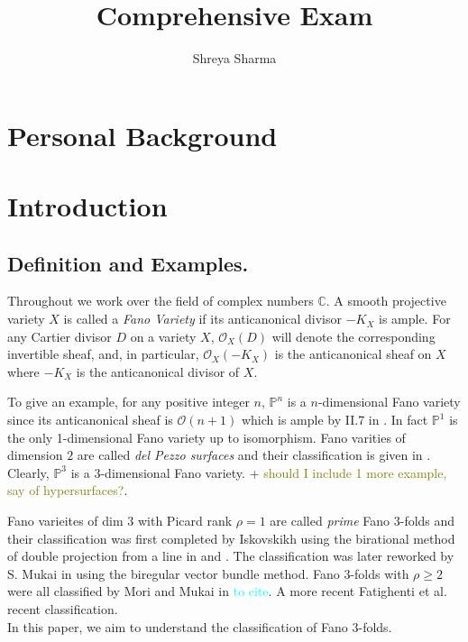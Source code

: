 \documentclass[11pt]{amsart}
\theoremstyle{plain}
\theoremstyle{definition}
\theoremstyle{expl}
\begin{document}
	\title{Comprehensive Exam}
	\date{}
	\author{\small{Shreya Sharma}}
	\maketitle
	\tableofcontents
	
\section{Personal Background}

\section{Introduction}
\subsection{Definition and Examples.} Throughout we work over the field of complex numbers $\mathbb{C}$.
A smooth projective variety $X$ is called a \textit{Fano Variety} if its anticanonical divisor $-K_X$ is ample.
For any Cartier divisor $D$ on a variety $X$, $\mathcal{O}_X(D)$ will denote the corresponding invertible sheaf, and, in particular, $\mathcal{O}_X(-K_X)$ is the anticanonical sheaf on $X$ where $-K_X$ is the anticanonical divisor of $X$. 

To give an example, for any positive integer $n$,  $\mathbb{P}^n$ is a $n$-dimensional Fano variety since its anticanonical sheaf is $\mathcal{O}(n+1)$ which is ample by II.7 in \cite{Hartshorne}. In fact $\mathbb{P}^1$ is the only 1-dimensional Fano variety up to isomorphism. Fano varities of dimension $2$ are called \textit{del Pezzo surfaces} and their classification is given in \cite{FanoV}. Clearly, $\mathbb{P}^3$ is a $3$-dimensional Fano variety. + \textcolor{olive}{should I include 1 more example, say of hypersurfaces?}. 

 Fano varieites of dim $3$ with Picard rank $\rho =1$ are called \textit{prime} Fano $3$-folds and their classification was first completed by Iskovskikh using the birational method of double projection from a line in \cite{Isk77} and \cite{Isk78}. The classification was later reworked by S. Mukai in \cite{Muk89} using the biregular vector bundle method. Fano $3$-folds with $\rho\geq 2$ were all classified by Mori and Mukai in \textcolor{cyan}{to cite}. A more recent Fatighenti et al. recent classification.\\
In this paper, we aim to understand the classification of Fano $3$-folds. 
\end{document}
